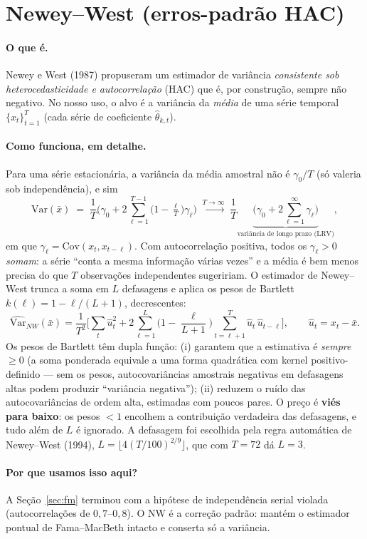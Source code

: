 \documentclass[11pt,a4paper]{article}
\newcommand{\porque}[0]{\paragraph{Por que usamos isso aqui?}}
\newcommand{\oquee}[0]{\paragraph{O que é.}}
\newcommand{\comofunciona}[0]{\paragraph{Como funciona, em detalhe.}}
\begin{document}
\section{Newey--West (erros-padrão HAC)}
\label{sec:nw}

\oquee Newey e West (1987) propuseram um estimador de variância \emph{consistente sob
heterocedasticidade e autocorrelação} (HAC) que é, por construção, sempre não negativo. No nosso
uso, o alvo é a variância da \emph{média} de uma série temporal $\{x_t\}_{t=1}^T$ (cada série de
coeficiente $\widehat\theta_{k,t}$).

\comofunciona Para uma série estacionária, a variância da média amostral não é
$\gamma_0/T$ (só valeria sob independência), e sim
\begin{equation}
\mathrm{Var}(\bar x) \;=\; \frac{1}{T}\Big(\gamma_0 + 2\sum_{\ell=1}^{T-1}\big(1-\tfrac{\ell}{T}\big)\gamma_\ell\Big)
\;\xrightarrow{T\to\infty}\; \frac{1}{T}\underbrace{\Big(\gamma_0+2\sum_{\ell=1}^{\infty}\gamma_\ell\Big)}_{\text{variância de longo prazo (LRV)}},
\end{equation}
em que $\gamma_\ell=\mathrm{Cov}(x_t,x_{t-\ell})$. Com autocorrelação positiva, todos os
$\gamma_\ell>0$ \emph{somam}: a série ``conta a mesma informação várias vezes'' e a média é bem
menos precisa do que $T$ observações independentes sugeririam. O estimador de Newey--West trunca a
soma em $L$ defasagens e aplica os pesos de Bartlett $k(\ell)=1-\ell/(L+1)$, decrescentes:
\begin{equation}
\widehat{\mathrm{Var}}_{NW}(\bar x) = \frac{1}{T^2}\Big[\sum_t \widehat u_t^2
+ 2\sum_{\ell=1}^{L}\Big(1-\frac{\ell}{L+1}\Big)\sum_{t=\ell+1}^{T}\widehat u_t\,\widehat u_{t-\ell}\Big],
\qquad \widehat u_t = x_t-\bar x .
\label{eq:nwvar}
\end{equation}
Os pesos de Bartlett têm dupla função: (i) garantem que a estimativa é \emph{sempre
$\geq0$} (a soma ponderada equivale a uma forma quadrática com kernel positivo-definido --- sem os
pesos, autocovariâncias amostrais negativas em defasagens altas podem produzir ``variância
negativa''); (ii) reduzem o ruído das autocovariâncias de ordem alta, estimadas com poucos pares.
O preço é \textbf{viés para baixo}: os pesos $<1$ encolhem a contribuição verdadeira das
defasagens, e tudo além de $L$ é ignorado. A defasagem foi escolhida pela regra automática de
Newey--West (1994), $L=\lfloor 4(T/100)^{2/9}\rfloor$, que com $T=72$ dá $L=3$.

\porque A Seção~\ref{sec:fm} terminou com a hipótese de independência serial violada
(autocorrelações de $0{,}7$--$0{,}8$). O NW é a correção padrão: mantém o estimador pontual de
Fama--MacBeth intacto e conserta só a variância.
\end{document}
